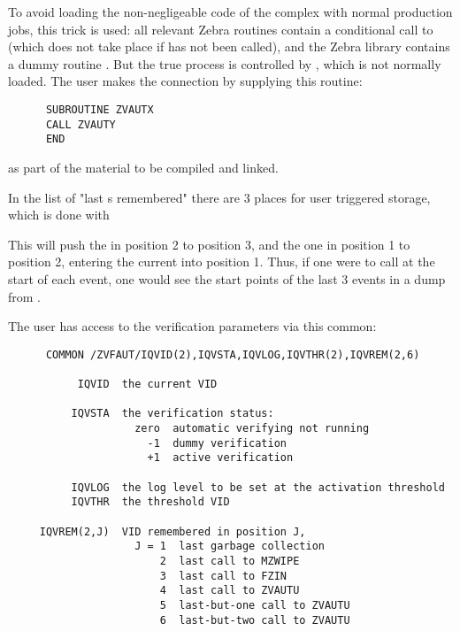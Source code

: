 To avoid loading the non-negligeable code of the  complex with
normal production jobs, this trick is used: all relevant Zebra routines
contain a conditional call to  (which does not take place if
 has not been called), and the Zebra library contains a dummy
routine . But the true process is controlled by , which
is not normally loaded. The user makes the connection by supplying
this routine:

\begin{verbatim}
      SUBROUTINE ZVAUTX
      CALL ZVAUTY
      END
\end{verbatim} 
as part of the material to be compiled and linked.

In the list of "last s remembered" there are 3 places for user
triggered storage, which is done with


                 
This will push the  in position 2 to position 3, and the one in
position 1 to position 2, entering the current  into position 1.
Thus, if one were to call  at the start of each event,
one would see the start points of the last 3 events in a dump
from .

The user has access to the verification parameters via this common:

\begin{verbatim}
      COMMON /ZVFAUT/IQVID(2),IQVSTA,IQVLOG,IQVTHR(2),IQVREM(2,6)

           IQVID  the current VID

          IQVSTA  the verification status:
                    zero  automatic verifying not running
                      -1  dummy verification
                      +1  active verification

          IQVLOG  the log level to be set at the activation threshold
          IQVTHR  the threshold VID

     IQVREM(2,J)  VID remembered in position J,
                    J = 1  last garbage collection
                        2  last call to MZWIPE
                        3  last call to FZIN
                        4  last call to ZVAUTU
                        5  last-but-one call to ZVAUTU
                        6  last-but-two call to ZVAUTU
\end{verbatim} 


\Examples

